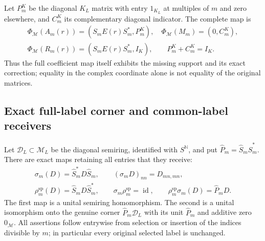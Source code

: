Let $P_m^K$ be the diagonal $K_L$ matrix with entry $1_{K_L}$
at multiples of $m$ and zero elsewhere, and $C_m^K$ its
complementary diagonal indicator. The complete map is
\begin{equation}\tag{HCR13}
\begin{gathered}
 \Phi_{\mathscr M}(A_m(r))=(S_mE(r)S_m^*,P_m^K),\quad
 \Phi_{\mathscr M}(M_m)=(0,C_m^K),\\
 \Phi_{\mathscr M}(R_m(r))=(S_mE(r)S_m^*,I_K),\qquad
                         P_m^K+C_m^K=I_K.
\end{gathered}
\end{equation}
Thus the full coefficient map itself exhibits the missing
support and its exact correction; equality in the complex
coordinate alone is not equality of the original matrices.

\subsection{Exact full-label corner and common-label receivers}

Let $\mathscr D_L\subset\mathscr M_L$ be the diagonal
semiring, identified with $S^{\mathbb N}$, and put
$\widehat P_m=\widehat S_m\widehat S_m^*$.
There are exact maps retaining all entries that they receive:
\begin{equation}\tag{HCR14}
\begin{gathered}
 \sigma_m(D)=\widehat S_m^*D\widehat S_m,
          \qquad(\sigma_mD)_{nn}=D_{mn,mn},\\
 \rho_m^{\mathrm{sp}}(D)=\widehat S_mD\widehat S_m^*,\qquad
 \sigma_m\rho_m^{\mathrm{sp}}=\operatorname{id},\qquad
 \rho_m^{\mathrm{sp}}\sigma_m(D)=\widehat P_mD.
\end{gathered}
\end{equation}
The first map is a unital semiring homomorphism.
The second is a unital isomorphism onto the genuine
corner $\widehat P_m\mathscr D_L$ with its unit
$\widehat P_m$ and additive zero $0_{\mathscr M}$.
All assertions follow entrywise from selection or insertion
of the indices divisible by $m$; in particular every
original selected label is unchanged.

